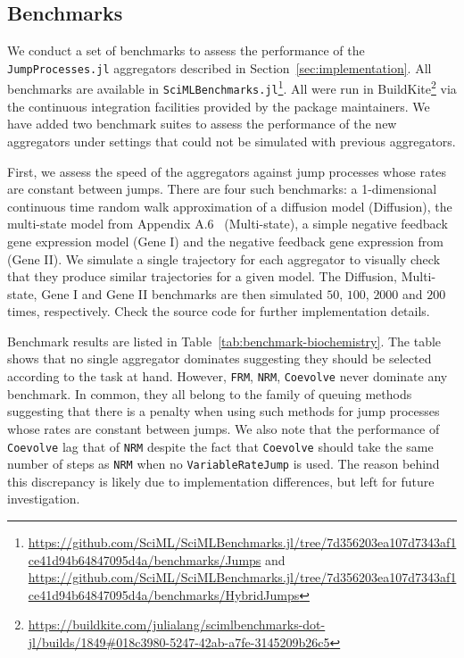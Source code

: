\documentclass{juliacon}
\numberwithin{equation}{section}
\begin{document}
\subsection{Benchmarks} \label{subsec:benchmark}

We conduct a set of benchmarks to assess the performance of the \texttt{JumpProcesses.jl} aggregators described in Section~\ref{sec:implementation}. All benchmarks are available in \texttt{SciMLBenchmarks.jl}\footnote{\url{https://github.com/SciML/SciMLBenchmarks.jl/tree/7d356203ea107d7343af1ce41d94b64847095d4a/benchmarks/Jumps} and \url{https://github.com/SciML/SciMLBenchmarks.jl/tree/7d356203ea107d7343af1ce41d94b64847095d4a/benchmarks/HybridJumps}}. All were run in BuildKite\footnote{\url{https://buildkite.com/julialang/scimlbenchmarks-dot-jl/builds/1849\#018c3980-5247-42ab-a7fe-3145209b26c5}} via the continuous integration facilities provided by the package maintainers. We have added two benchmark suites to assess the performance of the new aggregators under settings that could not be simulated with previous aggregators.

First, we assess the speed of the aggregators against jump processes whose rates are constant between jumps. There are four such benchmarks: a 1-dimensional continuous time random walk approximation of a diffusion model (Diffusion), the multi-state model from Appendix A.6~\cite{marchetti2017} (Multi-state), a simple negative feedback gene expression model (Gene I) and the negative feedback gene expression from~\cite{gupta2018} (Gene II). We simulate a single trajectory for each aggregator to visually check that they produce similar trajectories for a given model. The Diffusion, Multi-state, Gene I and Gene II benchmarks are then simulated \( 50 \), \( 100 \), \( 2000 \) and \( 200 \) times, respectively. Check the source code for further implementation details.

Benchmark results are listed in Table~\ref{tab:benchmark-biochemistry}. The table shows that no single aggregator dominates suggesting they should be selected according to the task at hand. However, \texttt{FRM}, \texttt{NRM}, \texttt{Coevolve} never dominate any benchmark. In common, they all belong to the family of queuing methods suggesting that there is a penalty when using such methods for jump processes whose rates are constant between jumps. We also note that the performance of \texttt{Coevolve} lag that of \texttt{NRM} despite the fact that \texttt{Coevolve} should take the same number of steps as \texttt{NRM} when no \texttt{VariableRateJump} is used. The reason behind this discrepancy is likely due to implementation differences, but left for future investigation.
\end{document}
